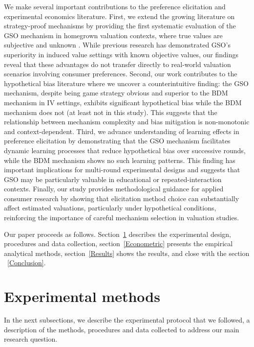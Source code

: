 \documentclass[12pt]{article}
\begin{document}
We make several important contributions to the preference elicitation and experimental economics literature. First, we extend the growing literature on strategy-proof mechanisms by providing the first systematic evaluation of the GSO mechanism in homegrown valuation contexts, where true values are subjective and unknown \citep{li_obviously_2017, pycia_theory_2023, chakraborty_future_2025}. While previous research has demonstrated GSO's superiority in induced value settings with known objective values, our findings reveal that these advantages do not transfer directly to real-world valuation scenarios involving consumer preferences. Second, our work contributes to the hypothetical bias literature \citep{penn2018understanding, cummings1999unbiased, loomis_whats_2011, fang_use_2021, list2001explicit, grebitus2013explaining} where we uncover a counterintuitive finding: the GSO mechanism, despite being game strategy obvious and superior to the BDM mechanism in IV settings, exhibits significant hypothetical bias while the BDM mechanism does not (at least not in this study). This suggests that the relationship between mechanism complexity and bias mitigation is non-monotonic and context-dependent. Third, we advance understanding of learning effects in preference elicitation \citep{drichoutis2011role, canavari2019run} by demonstrating that the GSO mechanism facilitates dynamic learning processes that reduce hypothetical bias over successive rounds, while the BDM mechanism shows no such learning patterns. This finding has important implications for multi-round experimental designs and suggests that GSO may be particularly valuable in educational or repeated-interaction contexts. Finally, our study provides methodological guidance for applied consumer research by showing that elicitation method choice can substantially affect estimated valuations, particularly under hypothetical conditions, reinforcing the importance of careful mechanism selection in valuation studies\citep{miller2011should, schmidt2020accurately}.

Our paper proceeds as follows. Section~\ref{Experiment} describes the experimental design, procedures and data collection, section~\ref{Econometric} presents the empirical analytical methods, section~\ref{Results} shows the results, and close with the section ~\ref{Conclusion}.

\section{Experimental methods}
\label{Experiment}
In the next subsections, we describe the experimental protocol that we followed, a description of the methods, procedures and data collected to address our main research question. 
\end{document}

